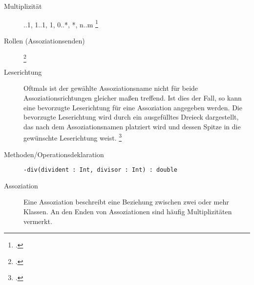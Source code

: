 \documentclass{bschlangaul-haupt}
\begin{document}
\begin{description}
\begin{center}
\end{center}

%

\item[Multiplizität]
..1, 1..1, 1, 0..*, *, n..m
\footcite[Seite 98 (PDF 115)]{uml}

%

\item[Rollen (Assoziationsenden)]
\footcite[Seite 145]{rupp}

\begin{center}
\end{center}

\item[Leserichtung]

Oftmals ist der gewählte Assoziationsname nicht für beide
Assoziationsrichtungen gleicher­ maßen treffend. Ist dies der Fall, so
kann eine bevorzugte Leserichtung für eine Assoziation angegeben werden.
Die bevorzugte Leserichtung wird durch ein ausgefülltes Dreieck
darge­stellt, das nach dem Assoziationsnamen platziert wird und dessen
Spitze in die gewünschte Leserichtung weist.
\footcite[Seite 144]{rupp}

\begin{center}
\end{center}

%

\item[Methoden/Operationsdeklaration]
\zB \verb|-div(divident : Int, divisor : Int) : double|

%

\item[Assoziation] Eine Assoziation beschreibt eine Beziehung zwischen
zwei oder mehr Klassen. An den Enden von Assoziationen sind häufig
Multiplizitäten vermerkt. 


\end{description}
\end{document}
